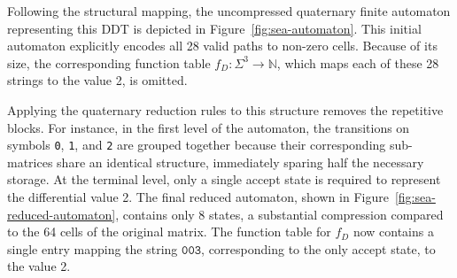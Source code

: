 

Following the structural mapping, the uncompressed quaternary finite automaton representing this DDT is depicted in Figure~\ref{fig:sea-automaton}. This initial automaton explicitly encodes all 28 valid paths to non-zero cells. Because of its size, the corresponding function table $f_{D} : \Sigma^{3} \to \mathbb{N}$, which maps each of these 28 strings to the value 2, is omitted.



Applying the quaternary reduction rules to this structure removes the repetitive blocks. For instance, in the first level of the automaton, the transitions on symbols \texttt{0}, \texttt{1}, and \texttt{2} are grouped together because their corresponding sub-matrices share an identical structure, immediately sparing half the necessary storage. At the terminal level, only a single accept state is required to represent the differential value 2. The final reduced automaton, shown in Figure~\ref{fig:sea-reduced-automaton}, contains only 8 states, a substantial compression compared to the 64 cells of the original matrix. The function table for $f_{D}$ now contains a single entry mapping the string $\texttt{003}$, corresponding to the only accept state, to the value 2.



